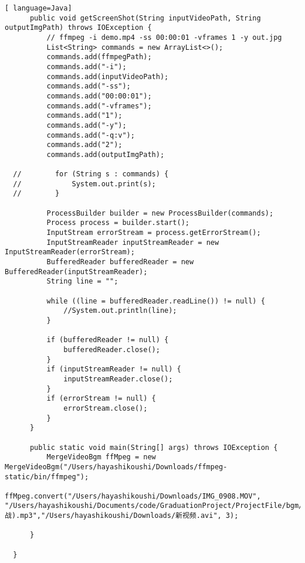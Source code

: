 \begin{lstlisting}[ language=Java]
      public void getScreenShot(String inputVideoPath, String outputImgPath) throws IOException {
          // ffmpeg -i demo.mp4 -ss 00:00:01 -vframes 1 -y out.jpg
          List<String> commands = new ArrayList<>();
          commands.add(ffmpegPath);
          commands.add("-i");
          commands.add(inputVideoPath);
          commands.add("-ss");
          commands.add("00:00:01");
          commands.add("-vframes");
          commands.add("1");
          commands.add("-y");
          commands.add("-q:v");
          commands.add("2");
          commands.add(outputImgPath);
  
  //        for (String s : commands) {
  //            System.out.print(s);
  //        }
  
          ProcessBuilder builder = new ProcessBuilder(commands);
          Process process = builder.start();
          InputStream errorStream = process.getErrorStream();
          InputStreamReader inputStreamReader = new InputStreamReader(errorStream);
          BufferedReader bufferedReader = new BufferedReader(inputStreamReader);
          String line = "";
  
          while ((line = bufferedReader.readLine()) != null) {
              //System.out.println(line);
          }
  
          if (bufferedReader != null) {
              bufferedReader.close();
          }
          if (inputStreamReader != null) {
              inputStreamReader.close();
          }
          if (errorStream != null) {
              errorStream.close();
          }
      }
  
      public static void main(String[] args) throws IOException {
          MergeVideoBgm ffMpeg = new MergeVideoBgm("/Users/hayashikoushi/Downloads/ffmpeg-static/bin/ffmpeg");
          ffMpeg.convert("/Users/hayashikoushi/Downloads/IMG_0908.MOV", "/Users/hayashikoushi/Documents/code/GraduationProject/ProjectFile/bgm/Panzerlied(少战).mp3","/Users/hayashikoushi/Downloads/新视频.avi", 3);
  
      }
  
  }
  
\end{lstlisting}